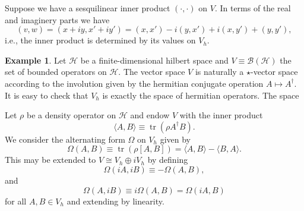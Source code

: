 \documentclass[prl,twocolumn,lengthcheck,superscriptaddress]{revtex4-1}
\newcommand{\tr}{\operatorname{tr}}
\theoremstyle{definition}
\newtheorem{example}{Example}
\theoremstyle{remark}
\begin{document}
Suppose we have a sesquilinear inner product $(\cdot ,\cdot )$ on $V$. In terms of the real and imaginery parts we have
\begin{equation}
	(v,w) = (x+iy, x'+iy') = (x,x') - i(y,x') + i(x,y') + (y,y'),
\end{equation}
i.e., the inner product is determined by its values on $V_h$.

\begin{example}
	Let $\mathcal{H}$ be a finite-dimensional hilbert space and $V \equiv \mathcal{B}(\mathcal{H})$ the set of bounded operators on $\mathcal{H}$. The vector space $V$ is naturally a $\star$-vector space according to the involution given by the hermitian conjugate operation $A\mapsto A^\dag$. It is easy to check that $V_h$ is exactly the space of hermitian operators. The space 
	
	Let $\rho$ be a density operator on $\mathcal{H}$ and endow $V$ with the inner product 
	\begin{equation}
		\langle A, B\rangle \equiv \tr(\rho A^\dag B).
	\end{equation}
	We consider the alternating form $\Omega$ on $V_h$ given by
	\begin{equation}
		\Omega(A,B) \equiv \tr(\rho [A,B]) = \langle A, B\rangle-\langle B, A\rangle.
	\end{equation}
	This may be extended to $V \cong V_h\oplus iV_h$ by defining
	\begin{equation}
		\Omega(iA,iB) \equiv -\Omega(A,B),
	\end{equation}
	and
	\begin{equation}
		\Omega(A,iB) \equiv i\Omega(A,B) = \Omega(iA,B)
	\end{equation}
	for all $A,B\in V_h$ and extending by linearity.
\end{example}
\end{document}
